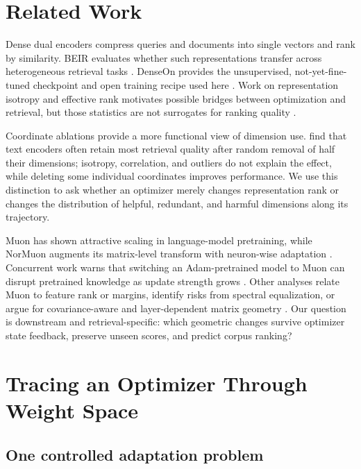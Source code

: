 \documentclass[11pt]{article}
\begin{document}
\section{Related Work}

Dense dual encoders compress queries and documents into single vectors and rank by similarity.
BEIR evaluates whether such representations transfer across heterogeneous retrieval tasks
\citep{thakur2021beir}. DenseOn provides the unsupervised, not-yet-fine-tuned checkpoint and open
training recipe used here \citep{sourty2026denseon}. Work on representation isotropy and effective
rank motivates possible bridges between optimization and retrieval, but those statistics are not
surrogates for ranking quality \citep{kim2024hil}.

Coordinate ablations provide a more functional view of dimension use. \citet{takeshita2025dimensions}
find that text encoders often retain most retrieval quality after random removal of half their
dimensions; isotropy, correlation, and outliers do not explain the effect, while deleting some
individual coordinates improves performance. We use this distinction to ask whether an optimizer
merely changes representation rank or changes the distribution of helpful, redundant, and harmful
dimensions along its trajectory.

Muon has shown attractive scaling in language-model pretraining, while NorMuon augments its
matrix-level transform with neuron-wise adaptation \citep{liu2025muon,li2025normuon}. Concurrent
work warns that switching an Adam-pretrained model to Muon can disrupt pretrained knowledge as
update strength grows \citep{qu2026finetune,liu2026consistency}. Other analyses relate Muon to
feature rank or margins, identify risks from spectral equalization, or argue for covariance-aware
and layer-dependent matrix geometry \citep{ruan2026features,pang2026htmuon,du2026newtonmuon,
massena2026schatten}. Our question is downstream and retrieval-specific: which geometric changes
survive optimizer state feedback, preserve unseen scores, and predict corpus ranking?

\section{Tracing an Optimizer Through Weight Space}

\subsection{One controlled adaptation problem}
\end{document}
